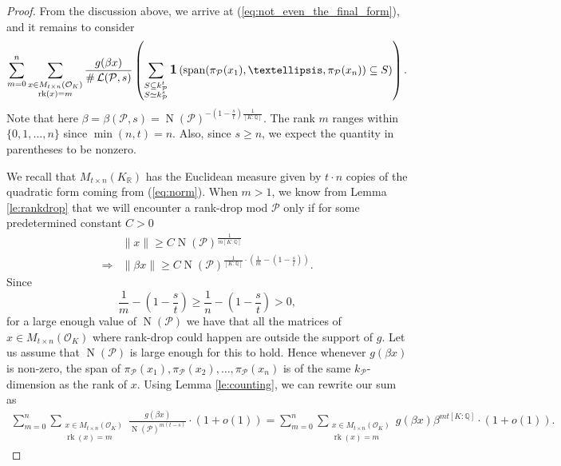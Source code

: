 \documentclass{amsart}
\DeclareMathOperator{\card}{\texttt{\#}}
\DeclareMathOperator{\rank}{rk}
\DeclareMathOperator{\spant}{span}
\DeclareMathOperator{\ind}{\mathlarger{\mathbf{1}}}
\DeclareMathOperator{\N}{N}
\begin{document}
\begin{proof}
From the discussion above, we arrive at (\ref{eq:not_even_the_final_form}), and it remains to consider
\begin{align}
\sum_{m=0}^{n}\sum_{\substack{x \in M_{t \times n }(\mathcal{O}_K) \\ \rank(x) = m}}
\frac{  g( \beta x)}{\card \mathcal{L}(\mathcal{P},s)} 
\left(
\sum_{\substack{  S \subseteq k_\mathcal{P}^{t} \\  S \simeq k_{\mathcal{P}}^{s} } } 
\ind\left(
\spant
( \pi_{\mathcal{P}}(x_1),\dots,\pi_{\mathcal{P}}(x_n)) \subseteq S
\right) \right).
\end{align}
Note that here $\beta = \beta(\mathcal{P},s) = \N(\mathcal{P})^{-\left(1-\frac{s}{t}\right)\frac{1}{[K:\mathbb{Q}]}}$. The rank $m$ ranges within $\{0,1,\dots,n\}$ since $\min(n,t)=n$. Also, since $s \ge n$, we expect the quantity in parentheses to be nonzero.\par
We recall that $M_{t \times n }(K_{\mathbb{R}})$ has the Euclidean measure given by $t \cdot  n$ copies of the quadratic form coming from (\ref{eq:norm}).
When $m>1$, we know from Lemma \ref{le:rankdrop} that we will encounter a rank-drop mod $\mathcal{P}$ only if for some predetermined constant $C>0$
\begin{align}
& \| x \|  \ge C \N(\mathcal{P})^{\frac{1}{m[K:\mathbb{Q}]}}  \\
\Rightarrow &  \|\beta x\| \ge C \N(\mathcal{P})^{\frac{1}{[K:\mathbb{Q}]} \cdot \left( \frac{1}{m} - \left(1 - \frac{s}{t}\right)\right)}.
\end{align}
Since 
\begin{equation}
\frac{1}{m} - \left(1-\frac{s}{t} \right) \ge  \frac{1}{n} - \left(1- \frac{s}{t}\right) > 0,
\end{equation}
for a large enough value of $\N(\mathcal{P})$ we have that all the matrices of $x \in M_{t  \times n }\left(\mathcal{O}_K\right)$ where rank-drop could happen are outside the support of $g$. Let us assume that $\N(\mathcal{P})$ is large enough for this to hold. Hence whenever $g(\beta x)$ is non-zero, the span of $ \pi_\mathcal{P}(x_1) , \pi_\mathcal{P}(x_2) ,\dots,  \pi_\mathcal{P}(x_n) $ is of the same $k_\mathcal{P}$-dimension as the rank of $x$. 
Using Lemma \ref{le:counting}, we can rewrite our sum as
{\small\begin{align}
\sum_{m=0}^{{n}}\sum_{\substack{x \in M_{t \times n }(\mathcal{O}_K) \\ \rank(x) = m}}
\frac{  g( \beta x)}{ \N(\mathcal{P})^{m(t-s)}} \cdot (1+o(1))
= \sum_{m=0}^{{n}}\sum_{\substack{x \in M_{t \times n }(\mathcal{O}_K) \\ \rank(x) = m}}
{  g( \beta x)}{ \beta^{mt[K:\mathbb{Q}]} } \cdot (1+o(1)).
\end{align}}


\end{proof}
\end{document}
